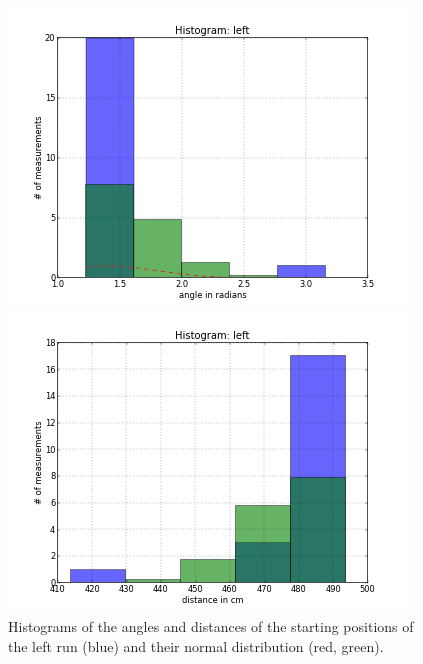 \documentclass{scrartcl}
\begin{document}
\begin{figure}[H]
\centering
\begin{minipage}{.5\textwidth}
  \centering
  \includegraphics[width=1.0\linewidth]{img/Angles_left_s.png}
\end{minipage}%
\begin{minipage}{.5\textwidth}
  \centering
  \includegraphics[width=1.0\linewidth]{img/Distances_left_s.png}
\end{minipage}
\caption{Histograms of the angles and distances of the starting positions of the left run (blue) and their normal distribution (red, green).}
\end{figure}
\end{document}
